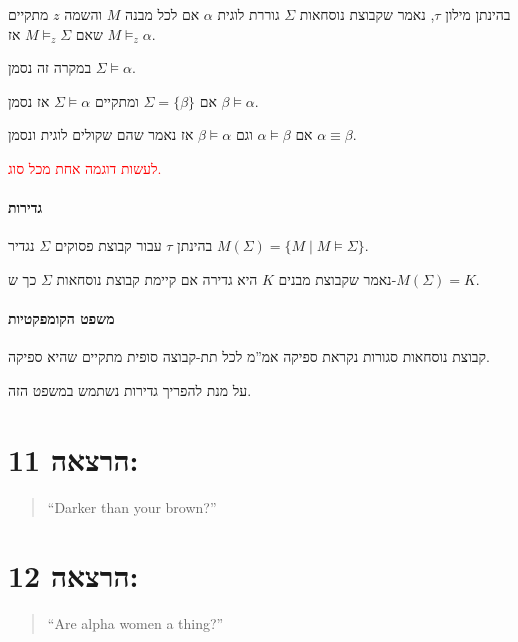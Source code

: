 \documentclass[12pt,a4paper]{article}
\begin{document}
בהינתן מילון $\tau$, נאמר שקבוצת נוסחאות $\Sigma$ גוררת לוגית $\alpha$ אם לכל מבנה $M$ והשמה $z$ מתקיים שאם $M\vDash_{z}\Sigma$ אז $M\vDash_{z}\alpha$.

במקרה זה נסמן $\Sigma\vDash\alpha$.

אם $\Sigma=\{\beta\}$ ומתקיים $\Sigma\vDash\alpha$ אז נסמן $\beta\vDash\alpha$.

אם $\alpha\vDash\beta$ וגם $\beta\vDash\alpha$ אז נאמר שהם שקולים לוגית ונסמן $\alpha\equiv\beta$.

\textcolor{red}{לעשות דוגמה אחת מכל סוג.}

\subsection*{גדירות}

בהינתן $\tau$ עבור קבוצת פסוקים $\Sigma$ נגדיר $M(\Sigma)=\{M \mid M\vDash\Sigma\}$.

נאמר שקבוצת מבנים $K$ היא גדירה אם קיימת קבוצת נוסחאות $\Sigma$ כך ש-$M(\Sigma)=K$.

\subsection*{משפט הקומפקטיות}

קבוצת נוסחאות סגורות נקראת ספיקה אמ''מ לכל תת-קבוצה סופית מתקיים שהיא ספיקה.

על מנת להפריך גדירות נשתמש במשפט הזה.

\part*{הרצאה 11:}

\begin{quote}
\textenglish{``Darker than your brown?''}
\end{quote}

\part*{הרצאה 12:}

\begin{quote}
\textenglish{``Are alpha women a thing?''}
\end{quote}
\end{document}
